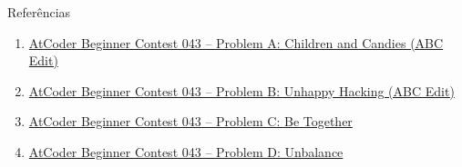 \begin{frame}[fragile]{Referências}

    \begin{enumerate}
        \item \href{https://atcoder.jp/contests/abc043/tasks/abc043_a}{AtCoder Beginner Contest 
            043 -- Problem A: Children and Candies (ABC Edit)}

        \item \href{https://atcoder.jp/contests/abc043/tasks/abc043_b}{AtCoder Beginner Contest 
            043 -- Problem B: Unhappy Hacking (ABC Edit)}

        \item \href{https://atcoder.jp/contests/abc042/tasks/arc059_a}{AtCoder Beginner Contest
            043 -- Problem C: Be Together}

        \item \href{https://atcoder.jp/contests/abc042/tasks/arc059_b}{AtCoder Beginner Contest
            043 -- Problem D: Unbalance}
    \end{enumerate}

\end{frame}
